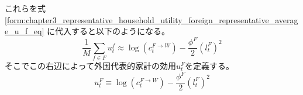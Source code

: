 これらを式
\eqref{form:chapter3_representative_household_utility_foreign_representative_average_u_f_eq}
に代入すると以下のようになる。
\begin{equation}
\label{form:chapter3_representative_household_utility_foreign_representative_average_u_f_modified_eq}
    \frac{1}{M}\sum_{f\in F}u_t^f\approx\log(c_t^{F\to W})-\frac{\phi^F}{2}(l_t^F)^2
\end{equation}
そこでこの右辺によって外国代表的家計の効用\(u_t^F\)を定義する。
\begin{equation}
\label{form:chapter3_representative_household_utility_foreign_representative_u_F_def}
    u_t^F\equiv\log(c_t^{F\to W})-\frac{\phi^F}{2}(l_t^F)^2
\end{equation}